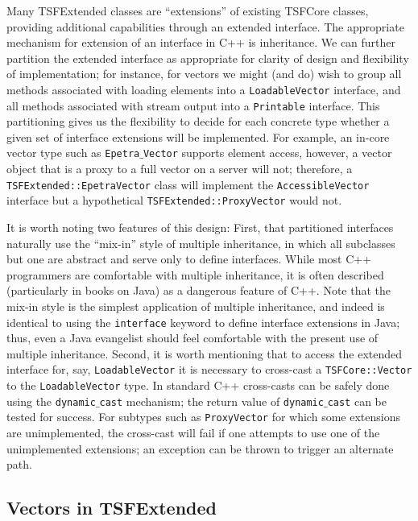 Many TSFExtended classes are ``extensions'' of existing TSFCore classes,
providing additional capabilities through an extended interface. 
The appropriate mechanism for extension of an interface in C++ is inheritance.
We can further partition the extended interface as appropriate for clarity
of design and flexibility of implementation; 
for instance, for vectors we might (and do) 
wish to group all methods associated with loading elements into 
a {\tt LoadableVector} interface, and all methods associated with
stream output into a {\tt Printable} interface. This partitioning gives
us the flexibility to decide for each concrete type whether a given
set of interface extensions will be implemented. For example, an in-core
vector type such as {\tt Epetra$\_$Vector} supports element access, however, 
a vector object that is a proxy to a full vector on a server will not; therefore, a 
{\tt TSFExtended::EpetraVector} class will implement the {\tt AccessibleVector}
interface but a hypothetical {\tt TSFExtended::ProxyVector} would not.

It is worth noting two features of this design: First, 
that partitioned interfaces naturally use the ``mix-in'' style 
of multiple inheritance, in which all subclasses but one are abstract and
serve only to define interfaces. While most C++ programmers are 
comfortable with multiple inheritance, it is often described (particularly
in books on Java) as a dangerous feature of C++. Note that the mix-in style
is the simplest application of multiple inheritance, and indeed is identical
to using the {\tt interface} keyword to define interface extensions
in Java; thus, even a Java evangelist should feel comfortable with the present
use of multiple inheritance.
Second, it is worth mentioning that to access the extended interface for, 
say, {\tt LoadableVector} it is necessary to cross-cast 
a {\tt TSFCore::Vector} to the {\tt LoadableVector} type. In standard C++
cross-casts can be safely done using the {\tt dynamic$\_$cast} mechanism; the
return value of {\tt dynamic$\_$cast} can be tested for success. 
For subtypes such as {\tt ProxyVector} for which some extensions
are unimplemented, the cross-cast will fail if one attempts to use
one of the unimplemented extensions; an exception can be thrown to trigger
an alternate path.

\subsection{Vectors in TSFExtended}

